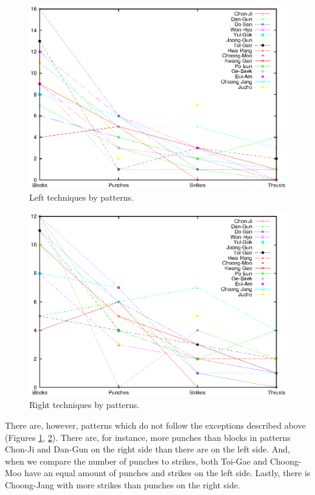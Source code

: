 \documentclass[10pt,twocolumn,a4paper]{article}
\begin{document}
  \begin{figure}
    \includegraphics[scale=0.65]{data/gnuplot/eps/patterns_left}
    \caption{Left techniques by patterns.}
    \label{fig:patterns_left}
  \end{figure}

  \begin{figure}
    \includegraphics[scale=0.65]{data/gnuplot/eps/patterns_right}
    \caption{Right techniques by patterns.}
    \label{fig:patterns_right}
  \end{figure}

  There are, however, patterns which do not follow the exceptions described
  above (Figures \ref{fig:patterns_left}, \ref{fig:patterns_right}). There
  are, for instance, more punches than blocks in patterns Chon-Ji and Dan-Gun
  on the right side than there are on the left side. And, when we compare the
  number of punches to strikes, both Toi-Gae and Choong-Moo have an equal
  amount of punches and strikes on the left side. Lastly, there is Choong-Jang
  with more strikes than punches on the right side.
\end{document}
